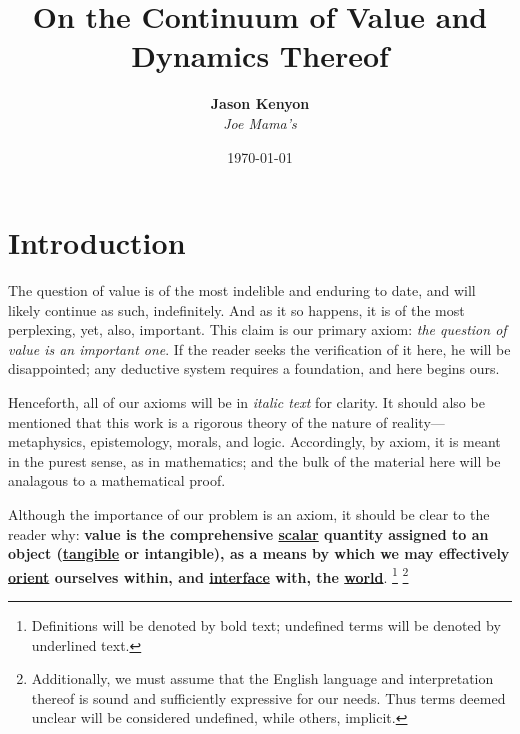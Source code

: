 \documentclass[11pt]{diazessay} %
\title{\textbf{On the Continuum of Value and Dynamics Thereof} \\ {\Large\itshape}} %
\author{\textbf{Jason Kenyon} \\ \textit{Joe Mama's}} %
\date{\today} %
\numberwithin{equation}{section}
\begin{document}
\maketitle %







\section*{Introduction}
The question of value is of the most indelible and enduring to date, and will likely continue as such, indefinitely. And as it so happens, it is of the most perplexing, yet, also, important. 
This claim is our primary axiom: \emph{the question of value is an important one}. If the reader seeks the verification of it here, he will be disappointed; any deductive system requires a foundation,
and here begins ours. 

Henceforth, all of our axioms will be in \emph{italic text} for clarity. It should also be mentioned that 
this work is a rigorous theory of the nature of reality---metaphysics, epistemology, morals, and logic. Accordingly, by axiom, it is meant in the purest sense, as in mathematics; and the bulk of the material here will be analagous to a mathematical proof.  

Although the importance of our problem is an axiom, it should be clear to the reader why: 
\textbf{value is the comprehensive \underline{scalar} quantity assigned to an object (\underline{tangible} or intangible), as a means by which we may effectively \underline{orient} ourselves within, and \underline{interface} with, the \underline{world}}.
\footnote{Definitions will be denoted by bold text; undefined terms will be denoted by underlined text.} \footnote{Additionally, we must assume that the English language and interpretation thereof is sound and sufficiently expressive for our needs. Thus terms deemed unclear will be considered undefined, while others, implicit.}
\end{document}
